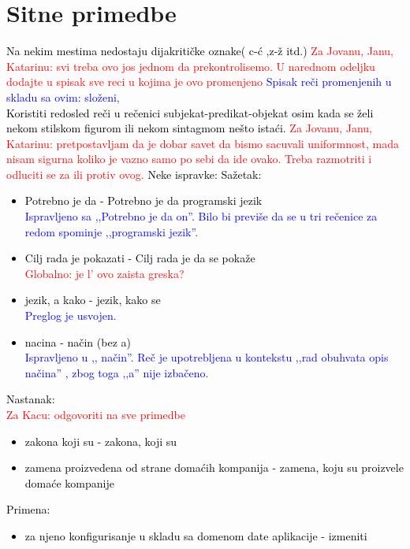 \documentclass[a4paper]{report}
\newcommand{\odgovor}[1]{\textcolor{black}{#1}}
\newcommand{\odgovorAutora}[1]{\textcolor{blue}{#1}}
\newcommand{\note}[1]{\textcolor{red}{#1}}
\begin{document}
\section{Sitne primedbe}
\odgovor{
Na nekim mestima nedostaju dijakritičke oznake( c-ć ,z-ž itd.)
\note{Za Jovanu, Janu, Katarinu: svi treba ovo jos jednom da prekontrolisemo. U narednom odeljku dodajte u spisak sve reci u kojima je ovo promenjeno} \odgovorAutora{Spisak reči promenjenih u skladu sa ovim: složeni, } \\
Koristiti redosled reči u rečenici subjekat-predikat-objekat osim kada se želi nekom stilskom figurom ili nekom sintagmom nešto istaći.
\note{Za Jovanu, Janu, Katarinu: pretpostavljam da je dobar savet da bismo sacuvali uniformnost, mada nisam sigurna koliko je vazno samo po sebi da ide ovako. Treba razmotriti i odluciti se za ili protiv ovog.}\newline
Neke ispravke:\newline
Sažetak:
\begin{itemize}
  \item Potrebno je da - Potrebno je da programski jezik \\
  \odgovorAutora{Ispravljeno sa ,,Potrebno je da on''. Bilo bi previše da se u tri rečenice za redom spominje ,,programski jezik''.}
  \item Cilj rada je pokazati - Cilj rada je da se pokaže \\
  \note{Globalno: je l' ovo zaista greska?}
  \item  jezik, a kako  -  jezik, kako se \\
  \odgovorAutora{Preglog je usvojen.}
  \item  nacina - način (bez a) \\
  \odgovorAutora{Ispravljeno u ,, način''. Reč je upotrebljena u kontekstu ,,rad obuhvata opis načina'' , zbog toga ,,a'' nije izbačeno.}
\end{itemize}
Nastanak: \\
\note{Za Kacu: odgovoriti na sve primedbe} 
\begin{itemize}
  \item zakona koji su - zakona, koji su
  \item zamena proizvedena od strane domaćih kompanija - zamena, koju su proizvele domaće kompanije
\end{itemize}
Primena:  
\begin{itemize}
  \item za njeno konfigurisanje u skladu sa domenom date aplikacije - izmeniti

\end{itemize}}
\end{document}
